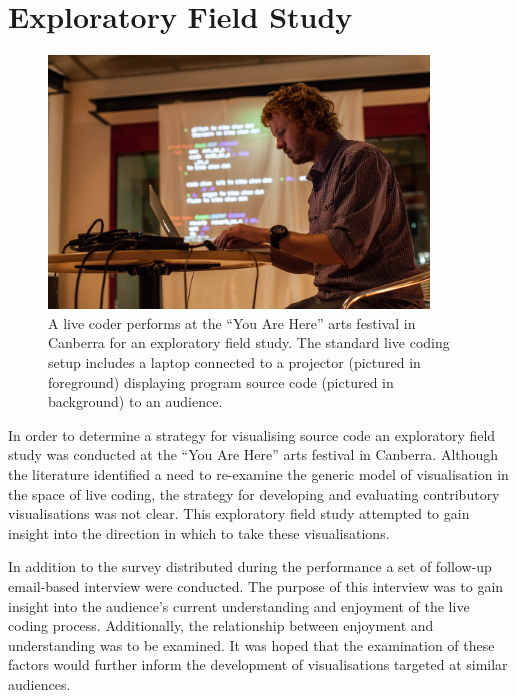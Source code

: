 
\chapter{Exploratory Field Study}
\label{chap:exploratory-field-study}

\begin{figure}
\centering
\includegraphics[width=0.9\textwidth]{../images/study-1-you-are-here-ben.jpg}
\caption{A live coder performs at the ``You Are Here'' arts festival in Canberra for an exploratory field study. The standard live coding setup includes a laptop connected to a projector (pictured in foreground) displaying program source code (pictured in background) to an audience.}
\label{fig:exploratory-field-study-ben}
\end{figure}


In order to determine a strategy for visualising source code an exploratory field study was conducted at the ``You Are Here'' arts festival in Canberra. Although the literature identified a need to re-examine the generic model of visualisation in the space of live coding, the strategy for developing and evaluating contributory visualisations was not clear. This exploratory field study attempted to gain insight into the direction in which to take these visualisations.

In addition to the survey distributed during the performance a set of follow-up email-based interview were conducted. The purpose of this interview was to gain insight into the audience's current understanding and enjoyment of the live coding process. Additionally, the relationship between enjoyment and understanding was to be examined. It was hoped that the examination of these factors would further inform the development of visualisations targeted at similar audiences.


